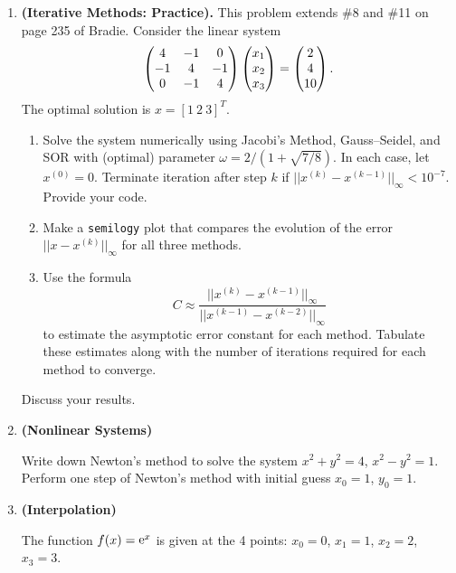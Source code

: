 \documentclass [12pt]{article}
\begin{document}
\begin{enumerate}

\item   \textbf{(Iterative Methods: Practice).}  This problem
extends \#8 and \#11 on page 235 of Bradie.  Consider the linear
system
$$
\begin{pmatrix}
4 & -1 & 0 \cr -1 & 4 & - 1 \cr 0 & -1 & 4 
\end{pmatrix}
\begin{pmatrix}
x_1 \cr x_2 \cr x_3 
\end{pmatrix}
= \begin{pmatrix}
 2 \cr 4 \cr 10 \end{pmatrix}.
$$
The optimal solution is $x = [1 \ 2 \ 3]^T$.

\begin{enumerate}
\item   Solve the system numerically using Jacobi's Method,
Gauss--Seidel, and SOR with (optimal) parameter $\omega = 2 / (1 +
\sqrt{7/8})$.  In each case, let $x^{(0)} = 0$.  Terminate
iteration after step $k$ if $||{ x^{(k)} - x^{(k-1)}}||_\infty <
10^{-7}$. Provide your code.

\item   Make a {\tt semilogy} plot that compares the evolution of
the error ${||x - x^{(k)}||}_\infty$ for all three methods.

\item   Use the formula
$$
C \approx \frac{|| {x^{(k)} - x^{(k-1)}}||_\infty }{ {||x^{(k-1)}
- x^{(k-2)}||} _\infty}
$$
to estimate the asymptotic error constant for each method.
Tabulate these estimates along with the number of iterations
required for each method to converge.
\end{enumerate}
Discuss your results.


\item \textbf{(Nonlinear Systems)} 

Write down Newton's method to
solve the system $ x^2+y^2=4$, $ x^2-y^2=1 $. Perform one step of
Newton's method with initial guess $x_0=1$, $y_0=1$.


\item \textbf{(Interpolation)}

The function $f(x) = \mathop{\rm e}\nolimits^x$ is given at the 4 points: $x_0 =0$, $x_1
=1$, $x_2 =2$, $x_3 =3$.


\end{enumerate}
\end{document}
